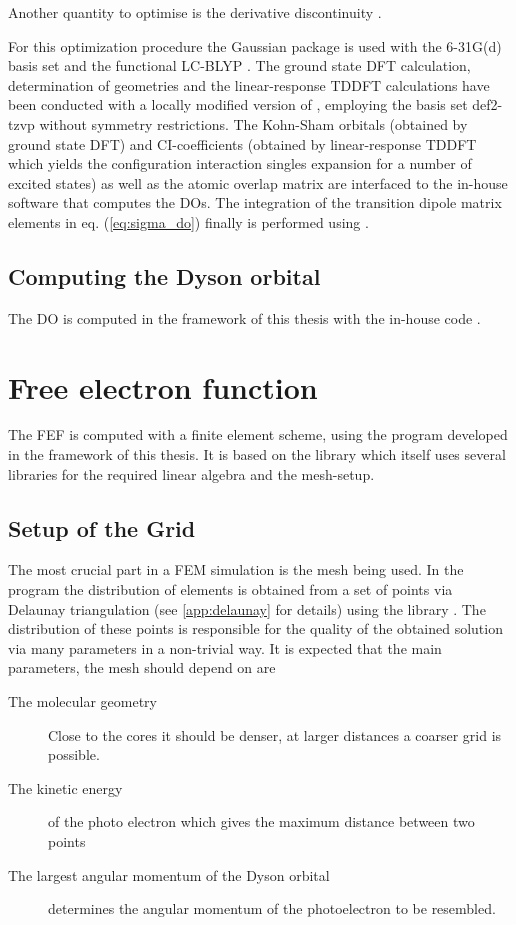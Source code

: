 Another quantity to optimise is the derivative discontinuity \cite{sanchez}.

For this optimization procedure the Gaussian package  \cite{g09} is used with the 6-31G(d) \cite{6-31g,6-31gd} basis set and the functional LC-BLYP \cite{lcblyp}. 
The ground state DFT calculation, determination of geometries and the linear-response TDDFT calculations have been conducted with a locally modified version of  \cite{nwchem}, employing the basis set def2-tzvp \cite{def2tzvp} without symmetry restrictions.
The Kohn-Sham orbitals (obtained by ground state DFT) and CI-coefficients (obtained by linear-response TDDFT which yields the configuration interaction singles expansion for a number of excited states) as well as the atomic overlap matrix are interfaced to the in-house software  \cite{MAgg} that computes the DOs.
The integration of the transition dipole matrix elements in eq. (\ref{eq:sigma_do}) finally is performed using  \cite{ezDyson}.

\subsection{Computing the Dyson orbital}
The DO is computed in the framework of this thesis with the in-house code  \cite{MAgg}.

\section{Free electron function}
The FEF is computed with a finite element scheme, using the program  developed in the framework of this thesis.
It is based on the library  \cite{libmesh} which itself uses several libraries for the required linear algebra and the mesh-setup.

\subsection{Setup of the Grid}
\label{sec:grid}
The most crucial part in a FEM simulation is the mesh being used. 
In the program  the distribution of elements is obtained from a set of points via Delaunay triangulation (see \ref{app:delaunay} for details) using the library  \cite{tetgen}.
The distribution of these points is responsible for the quality of the obtained solution via many parameters in a non-trivial way.
It is expected that the main parameters, the mesh should depend on are
\begin{description}
   \item[The molecular geometry] Close to the cores it should be denser, at larger distances a coarser grid is possible.
   \item[The kinetic energy] of the photo electron which gives the maximum distance between two points
   \item[The largest angular momentum of the Dyson orbital] determines the angular momentum of the photoelectron to be resembled.
\end{description}

